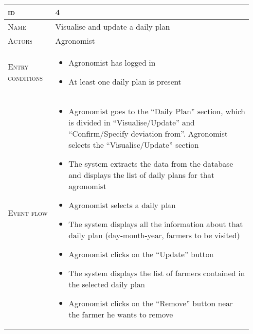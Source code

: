 \begin{table}[H]
    \centering
    \begin{tabular}[c]{|l|p{}|}
        \hline %
    	\textsc{id}                 &   4\\
    	\hline %
    	\textsc{Name}               &   Visualise and update a daily plan\\
    	\hline %
    	\textsc{Actors}             &   Agronomist\\
    	\hline %
    	\textsc{Entry conditions}   &   \begin{itemize}
                                    	    \item Agronomist has logged in
                                    	    \item At least one daily plan is present
                                        \end{itemize}\\
    	\hline %
    	\textsc{Event flow}         &   \footnotesize
            	                        \begin{itemize}
                                    	    \item Agronomist goes to the “Daily Plan” section, which is divided in “Visualise/Update” and “Confirm/Specify deviation from”. Agronomist selects the “Visualise/Update” section
                                    		\item The system extracts the data from the database and displays the list of daily plans for that agronomist
                                    		\item Agronomist selects a daily plan
                                    		\item The system displays all the information about that daily plan (day-month-year, farmers to be visited)
                                    		\item Agronomist clicks on the “Update” button
                                    		\item The system displays the list of farmers contained in the selected daily plan
                                    		\item Agronomist clicks on the “Remove” button near the farmer he wants to remove

\end{itemize}
\end{tabular}
\end{table}
